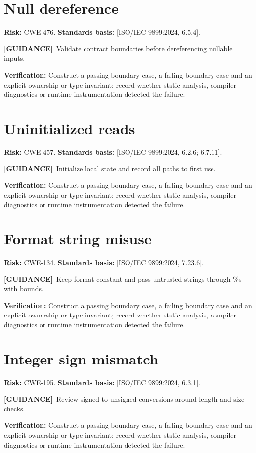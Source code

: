 \documentclass[10pt,letterpaper,oneside]{report}
\newcommand{\refcl}[1]{\textsf{\footnotesize[ISO/IEC 9899:2024, #1]}}
\newcommand{\guidance}{\textbf{[GUIDANCE]}}
\begin{document}
\section{Null dereference}
\textbf{Risk:} CWE-476. \textbf{Standards basis:} \refcl{6.5.4}.\par\guidance\ Validate contract boundaries before dereferencing nullable inputs.\par\textbf{Verification:} Construct a passing boundary case, a failing boundary case and an explicit ownership or type invariant; record whether static analysis, compiler diagnostics or runtime instrumentation detected the failure.
\section{Uninitialized reads}
\textbf{Risk:} CWE-457. \textbf{Standards basis:} \refcl{6.2.6; 6.7.11}.\par\guidance\ Initialize local state and record all paths to first use.\par\textbf{Verification:} Construct a passing boundary case, a failing boundary case and an explicit ownership or type invariant; record whether static analysis, compiler diagnostics or runtime instrumentation detected the failure.
\section{Format string misuse}
\textbf{Risk:} CWE-134. \textbf{Standards basis:} \refcl{7.23.6}.\par\guidance\ Keep format constant and pass untrusted strings through \%s with bounds.\par\textbf{Verification:} Construct a passing boundary case, a failing boundary case and an explicit ownership or type invariant; record whether static analysis, compiler diagnostics or runtime instrumentation detected the failure.
\section{Integer sign mismatch}
\textbf{Risk:} CWE-195. \textbf{Standards basis:} \refcl{6.3.1}.\par\guidance\ Review signed-to-unsigned conversions around length and size checks.\par\textbf{Verification:} Construct a passing boundary case, a failing boundary case and an explicit ownership or type invariant; record whether static analysis, compiler diagnostics or runtime instrumentation detected the failure.
\end{document}
